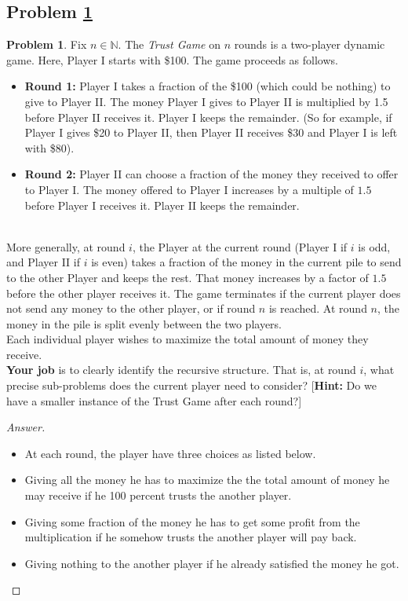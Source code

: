 \documentclass[11pt]{article}
\theoremstyle{definition}
\theoremstyle{definition}
\newtheorem{required}{Problem}
\theoremstyle{definition}
\begin{document}
\newpage
\subsection{Problem \ref{DP2}}
\begin{required} \label{DP2}
Fix $n \in \mathbb{N}$. The \textit{Trust Game} on $n$ rounds is a two-player dynamic game. Here, Player I starts with \$100. The game proceeds as follows.
\begin{itemize}
\item \textbf{Round 1:} Player I takes a fraction of the \$100 (which could be nothing) to give to Player II. The money Player I gives to Player II is multiplied by 1.5 before Player II receives it. Player I keeps the remainder. (So for example, if Player I gives \$20 to Player II, then Player II receives \$30 and Player I is left with \$80).

\item \textbf{Round 2:} Player II can choose a fraction of the money they received to offer to Player I. The money offered to Player I increases by a multiple of $1.5$  before Player I receives it. Player II keeps the remainder.
\end{itemize}

\noindent \\ More generally, at round $i$, the Player at the current round (Player I if $i$ is odd, and Player II if $i$ is even) takes a fraction of the money in the current pile to send to the other Player and keeps the rest. That money increases by a factor of $1.5$ before the other player receives it. The game terminates if the current player does not send any money to the other player, or if round $n$ is reached. At round $n$, the money in the pile is split evenly between the two players. \\

\noindent Each individual player wishes to maximize the total amount of money they receive. \\

\noindent \textbf{Your job} is to clearly identify the recursive structure. That is, at round $i$, what precise sub-problems does the current player need to consider? [\textbf{Hint:} Do we have a smaller instance of the Trust Game after each round?]
\end{required}

\begin{proof}[Answer]
\begin{itemize}
\item At each round, the player have three choices as listed below.
\item Giving all the money he has to maximize the the total amount of money he may receive if he 100 percent trusts the another player.
\item Giving some fraction of the money he has to get some profit from the multiplication if he somehow trusts the another player will pay back.
\item Giving nothing to the another player if he already satisfied the money he got.
\end{itemize}
\end{proof}
\end{document}

